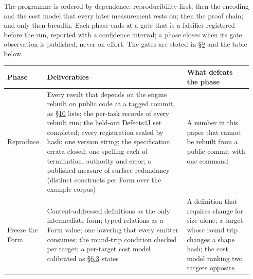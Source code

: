 \documentclass[10pt,letterpaper]{article}
\newcounter{none}
\begin{document}
The programme is ordered by dependence: reproducibility first; then the
encoding and the cost model that every later measurement rests on; then
the proof chain; and only then breadth. Each phase ends at a gate that
is a falsifier registered before the run, reported with a confidence
interval; a phase closes when its gate observation is published, never
on effort. The gates are stated in
\href{https://research.openie.dev/papers/rce/\#9-falsifiers}{§9} and the
table below.

{\def\LTcaptype{none} %
{\footnotesize\setlength{\tabcolsep}{3.8pt}\renewcommand{\arraystretch}{1.15}
\begin{longtable}[]{@{}
  >{\raggedright\arraybackslash}p{}
  >{\raggedright\arraybackslash}p{}
  >{\raggedright\arraybackslash}p{}@{}}
\toprule\noalign{}
\begin{minipage}[b]{\linewidth}\raggedright
\textbf{Phase}
\end{minipage} & \begin{minipage}[b]{\linewidth}\raggedright
\textbf{Deliverables}
\end{minipage} & \begin{minipage}[b]{\linewidth}\raggedright
\textbf{What defeats the phase}
\end{minipage} \\
\midrule\noalign{}
\endhead
\bottomrule\noalign{}
\endlastfoot
0 Reproduce & Every result that depends on the engine rebuilt on public
code at a tagged commit, as
\href{https://research.openie.dev/papers/rce/\#10-work-to-finish}{§10}
lists; the per-task records of every rebuilt run; the held-out Defects4J
set completed; every registration sealed by hash; one version string;
the specification errata closed; one spelling each of termination,
authority and error; a published measure of surface redundancy (distinct
constructs per Form over the example corpus) & A number in this paper
that cannot be rebuilt from a public commit with one command \\
1 Freeze the Form & Content-addressed definitions as the only
intermediate form; typed relations as a Form value; one lowering that
every emitter consumes; the round-trip condition checked per target; a
per-target cost model calibrated as
\href{https://research.openie.dev/papers/rce/\#63-energy}{§6.3} states &
A definition that requires change for size alone; a target whose round
trip changes a shape hash; the cost model ranking two targets opposite

\end{longtable}}}
\end{document}
